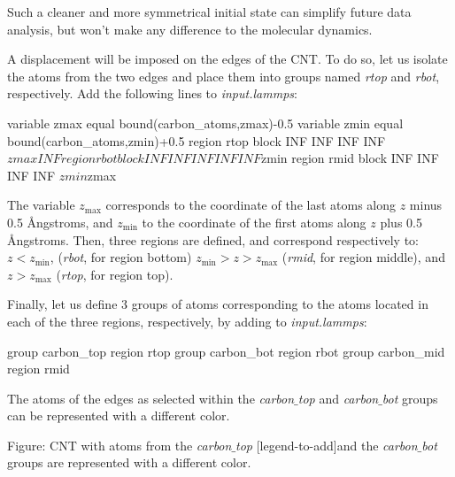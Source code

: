 \noindent \begin{tcolorbox}[colback=mylightblue!5!white,colframe=mylightblue!75!black,title=Note]

\vspace{0.25cm} \noindent Such a cleaner and more symmetrical initial state can simplify
future data analysis, but won't make any difference to 
the molecular dynamics.
\end{tcolorbox}

\noindent A displacement will be imposed on the edges of the CNT. To do so, let us isolate the
atoms from the two edges and place them into groups named \textit{rtop}
and \textit{rbot}, respectively.
Add the following lines to \textit{input.lammps}:

\begin{lcverbatim}
variable zmax equal bound(carbon_atoms,zmax)-0.5
variable zmin equal bound(carbon_atoms,zmin)+0.5
region rtop block INF INF INF INF ${zmax} INF
region rbot block INF INF INF INF INF ${zmin}
region rmid block INF INF INF INF ${zmin} ${zmax}
\end{lcverbatim}

\noindent The variable $z_\mathrm{max}$ corresponds to
the coordinate of the last atoms along $z$ minus 0.5
Ångstroms, and $z_\mathrm{min}$ to the coordinate of
the first atoms along $z$ plus 0.5 Ångstroms. Then, three
regions are defined, and correspond respectively to: $z < z_\mathrm{min}$,
(\textit{rbot}, for region bottom)
$z_\mathrm{min} > z > z_\mathrm{max}$
(\textit{rmid}, for region middle), and  
$z > z_\mathrm{max}$
(\textit{rtop}, for region top).

\vspace{0.25cm} \noindent Finally, let us define 3 groups of atoms
corresponding to the atoms located in each of the three regions,
respectively, by adding to \textit{input.lammps}:

\begin{lcverbatim}
group carbon_top region rtop
group carbon_bot region rbot
group carbon_mid region rmid
\end{lcverbatim}

\noindent The atoms of the edges as selected within the \textit{carbon$\_$top}
and \textit{carbon$\_$bot} groups can be represented with a different color.

\vspace{0.25cm} Figure: CNT with atoms from the \textit{carbon$\_$top}
[legend-to-add]and the \textit{carbon$\_$bot} groups are represented with a different color.

